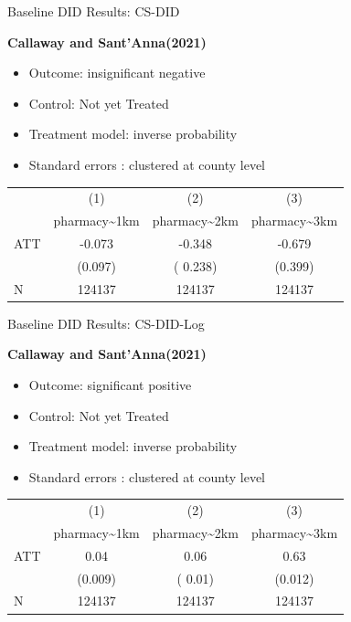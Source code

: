 \documentclass{beamer}
\begin{document}
\begin{frame}{Baseline DID Results: CS-DID}

\textbf{Callaway and Sant'Anna(2021)}

\begin{itemize}
    \item Outcome: insignificant negative
    \item Control:  Not yet Treated
    \item Treatment model: inverse probability
    \item Standard errors : clustered at  county level
\end{itemize}

\vspace{0.5em}
\centering
\footnotesize
\begin{tabular}{lccc}
\toprule
 & (1) & (2) & (3) \\
 & pharmacy\textasciitilde 1km & pharmacy\textasciitilde 2km & pharmacy\textasciitilde 3km \\
\midrule
ATT &  -0.073  &   -0.348       &    -0.679      \\
    & (0.097) &   ( 0.238)       &  (0.399)      \\
\midrule
N   &  124137   & 124137   & 124137  \\
\bottomrule
\end{tabular}


\end{frame}


\begin{frame}{Baseline DID Results: CS-DID-Log}

\textbf{Callaway and Sant'Anna(2021)}

\begin{itemize}
    \item Outcome: significant positive
    \item Control:  Not yet Treated
    \item Treatment model: inverse probability
    \item Standard errors : clustered at  county level
\end{itemize}

\vspace{0.5em}
\centering
\footnotesize
\begin{tabular}{lccc}
\toprule
 & (1) & (2) & (3) \\
 & pharmacy\textasciitilde 1km & pharmacy\textasciitilde 2km & pharmacy\textasciitilde 3km \\
\midrule
ATT &  0.04 &   0.06       &    0.63      \\
    & (0.009) &   ( 0.01)       &  (0.012)      \\
\midrule
N   &  124137   & 124137   & 124137  \\
\bottomrule
\end{tabular}


\end{frame}
\end{document}
